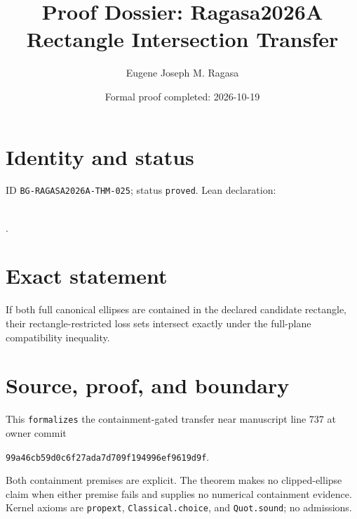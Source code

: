 \documentclass[11pt]{article}
\title{Proof Dossier: Ragasa2026A Rectangle Intersection Transfer}\author{Eugene Joseph M. Ragasa}\date{Formal proof completed: 2026-10-19}
\begin{document}
\maketitle
\section{Identity and status}
ID \texttt{BG-RAGASA2026A-THM-025}; status \texttt{proved}. Lean declaration:
\par{}\\
{\tiny{}}.
\section{Exact statement}
If both full canonical ellipses are contained in the declared candidate rectangle, their
rectangle-restricted loss sets intersect exactly under the full-plane compatibility
inequality.
\section{Source, proof, and boundary}
This \texttt{formalizes} the containment-gated transfer near manuscript line 737 at owner
commit
\begin{center}\small\texttt{99a46cb59d0c6f27ada7d709f194996ef9619d9f}.\end{center}
Both containment premises are explicit. The theorem makes no clipped-ellipse claim when
either premise fails and supplies no numerical containment evidence. Kernel axioms are
\texttt{propext}, \texttt{Classical.choice}, and \texttt{Quot.sound}; no admissions.
\end{document}
